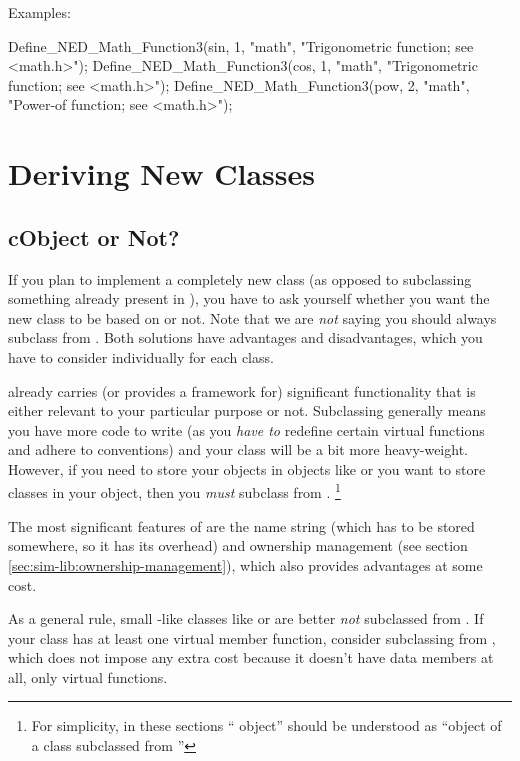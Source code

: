 Examples:

\begin{cpp}
Define_NED_Math_Function3(sin, 1, "math", "Trigonometric function; see <math.h>");
Define_NED_Math_Function3(cos, 1, "math", "Trigonometric function; see <math.h>");
Define_NED_Math_Function3(pow, 2, "math", "Power-of function; see <math.h>");
\end{cpp}



\section{Deriving New Classes}
\label{sec:sim-lib:deriving-new-classes}

\subsection{cObject or Not?}
\label{sec:sim-lib:cobject-or-not}

If you plan to implement a completely new class (as opposed to
subclassing something already present in {\opp}), you have
to ask yourself whether you want the new class to be based
on  or not.
Note that we are \textit{not} saying you should always
subclass from .
Both solutions have advantages and disadvantages, which you
have to consider individually for each class.

 already carries (or provides a framework for)
significant functionality that is either relevant to
your particular purpose or not. Subclassing 
generally means you have more code to write (as you \textit{have to}
redefine certain virtual functions and adhere to conventions)
and your class will be a bit more heavy-weight.
However, if you need to store your objects in {\opp} objects like 
or you want to store {\opp} classes in your object,
then you \textit{must} subclass from .
  \footnote{For simplicity, in these sections ``{\opp} object''
  should be understood as ``object of a class subclassed from
  ''}

The most significant features of  are
the name string (which has to be stored somewhere, so it has
its overhead) and ownership management (see section
\ref{sec:sim-lib:ownership-management}), which
also provides advantages at some cost.

As a general rule, small -like classes like  or
 are better \textit{not} subclassed from .
If your class has at least one virtual member function, consider
subclassing from , which does not impose any
extra cost because it doesn't have data members at all, only
virtual functions.


